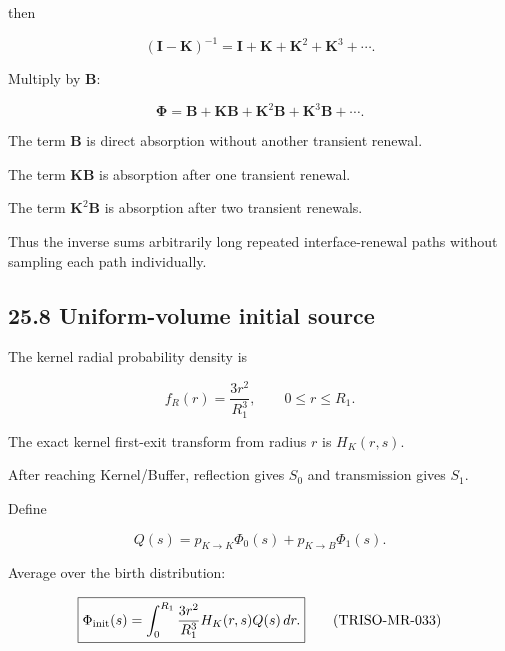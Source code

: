 \documentclass[11pt,a4paper]{article}
\begin{document}
then

\begin{equation}
(\mathbf I-\mathbf K)^{-1}
=
\mathbf I
+
\mathbf K
+
\mathbf K^2
+
\mathbf K^3
+\cdots.
\tag{TRISO-MR-029}
\label{eq:triso-mr-029}
\end{equation}

Multiply by $\mathbf B$:

\begin{equation}
\boldsymbol\Phi
=
\mathbf B
+
\mathbf K\mathbf B
+
\mathbf K^2\mathbf B
+
\mathbf K^3\mathbf B
+\cdots.
\tag{TRISO-MR-030}
\label{eq:triso-mr-030}
\end{equation}

The term $\mathbf B$ is direct absorption without another transient renewal.

The term $\mathbf K\mathbf B$ is absorption after one transient renewal.

The term $\mathbf K^2\mathbf B$ is absorption after two transient renewals.

Thus the inverse sums arbitrarily long repeated interface-renewal paths without sampling each path individually.

\subsection*{25.8 Uniform-volume initial source}

The kernel radial probability density is

\begin{equation}
f_R(r)
=
\frac{3r^2}{R_1^3},
\qquad
0\le r\le R_1.
\tag{TRISO-MR-031}
\label{eq:triso-mr-031}
\end{equation}

The exact kernel first-exit transform from radius $r$ is $H_K(r,s)$.

After reaching Kernel/Buffer, reflection gives $S_0$ and transmission gives $S_1$.

Define

\begin{equation}
Q(s)
=
p_{K\rightarrow K}\Phi_0(s)
+
p_{K\rightarrow B}\Phi_1(s).
\tag{TRISO-MR-032}
\label{eq:triso-mr-032}
\end{equation}

Average over the birth distribution:

\begin{equation}
\boxed{
\Phi_{\rm init}(s)
=
\int_0^{R_1}
\frac{3r^2}{R_1^3}
H_K(r,s)
Q(s)\,dr.
}
\tag{TRISO-MR-033}
\label{eq:triso-mr-033}
\end{equation}
\end{document}
